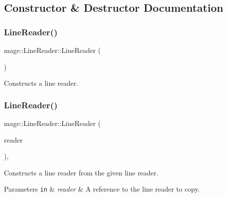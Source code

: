 \subsection{Constructor \& Destructor Documentation}
\hypertarget{classmage_1_1_line_reader_ab4a46321d7ea3ecda2d6390c78a7285b}{}\label{classmage_1_1_line_reader_ab4a46321d7ea3ecda2d6390c78a7285b} 
\subsubsection{\texorpdfstring{Line\+Reader()}{LineReader()}\hspace{0.1cm}{\footnotesize\ttfamily [1/3]}}
{\footnotesize\ttfamily mage\+::\+Line\+Reader\+::\+Line\+Reader (\begin{DoxyParamCaption}{ }\end{DoxyParamCaption})\hspace{0.3cm}{\ttfamily [protected]}}

Constructs a line reader. \hypertarget{classmage_1_1_line_reader_ae4f871bebae110704b34c0bd88460639}{}\label{classmage_1_1_line_reader_ae4f871bebae110704b34c0bd88460639} 
\subsubsection{\texorpdfstring{Line\+Reader()}{LineReader()}\hspace{0.1cm}{\footnotesize\ttfamily [2/3]}}
{\footnotesize\ttfamily mage\+::\+Line\+Reader\+::\+Line\+Reader (\begin{DoxyParamCaption}\item[{const \hyperlink{classmage_1_1_line_reader}{Line\+Reader} \&}]{reader }\end{DoxyParamCaption})\hspace{0.3cm}{\ttfamily [protected]}, {\ttfamily [delete]}}

Constructs a line reader from the given line reader.


\begin{DoxyParams}[1]{Parameters}
\mbox{\tt in}  & {\em reader} & A reference to the line reader to copy. \\
\hline
\end{DoxyParams}
\hypertarget{classmage_1_1_line_reader_ae90c546a98e113a48ca1c94b854a4866}{}\label{classmage_1_1_line_reader_ae90c546a98e113a48ca1c94b854a4866} 
